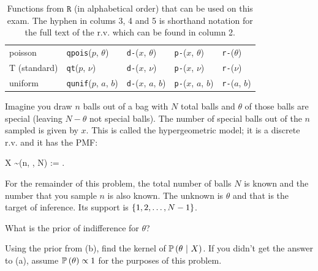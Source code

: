 \documentclass[12pt]{article}
\begin{document}
\begin{table}[htp]
\begin{tabular}{l | llll}

poisson & \texttt{qpois}($p$, $\theta$) 
& \texttt{d-}($x$, $\theta$)
& \texttt{p-}($x$, $\theta$) 
& \texttt{r-}($\theta$) \\

T (standard) & \texttt{qt}($p$, $\nu$) 
& \texttt{d-}($x$, $\nu$) 
& \texttt{p-}($x$, $\nu$)
& \texttt{r-}($\nu$) \\


uniform & \texttt{qunif}($p$, $a$, $b$) 
& \texttt{d-}($x$, $a$, $b$)
& \texttt{p-}($x$, $a$, $b$) 
& \texttt{r-}($a$, $b$) \\


\end{tabular}
\caption{Functions from $\texttt{R}$ (in alphabetical order) that can be used on this exam. The hyphen in colums 3, 4 and 5 is shorthand notation for the full text of the r.v. which can be found in column 2.
}
\label{tab:eqs}
\end{table}


\problem Imagine you draw $n$ balls out of a bag with $N$ total balls and $\theta$ of those balls are special (leaving $N-\theta$ not special balls). The number of special balls out of the $n$ sampled is given by $x$. This is called the hypergeometric model; it is a discrete r.v. and it has the PMF:

\beqn
X \sim {}(n, \theta, N) := .
\eeqn

For the remainder of this problem, the total number of balls $N$ is known and the number that you sample $n$ is also known. The unknown is $\theta$ and that is the target of inference. Its support is $\left\{1, 2, \ldots, N-1\right\}$.

\benum

 What is the prior of indifference for $\theta$?

 Using the prior from (b), find the kernel of $\mathbb{P}\left(\theta~|~X\right)$. If you didn't get the answer to (a), assume $\mathbb{P}\left(\theta\right) \propto 1$ for the purposes of this problem.
\end{document}
